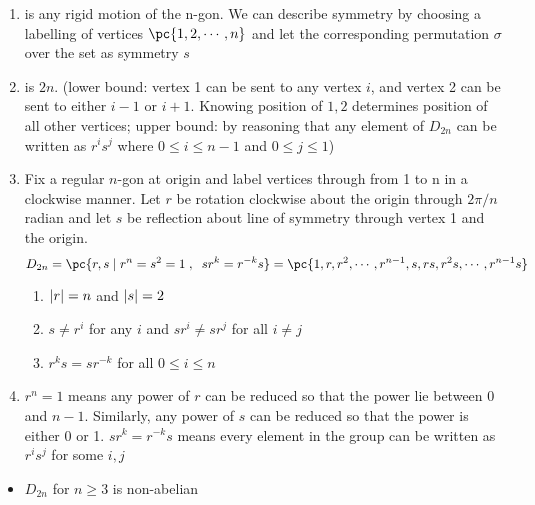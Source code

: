 \documentclass[11pt]{article}
\begin{document}
\begin{definition*}
    \begin{enumerate}
        \item {} is any rigid motion of the n-gon. We can describe symmetry by choosing a labelling of vertices $\pc{1,2,\cdots,n}$ and let the corresponding permutation $\sigma$ over the set as symmetry $s$
        \item {} is $2n$. (lower bound: vertex 1 can be sent to any vertex $i$, and vertex 2 can be sent to either $i-1$ or $i+1$. Knowing position of $1,2$ determines position of all other vertices; upper bound: by reasoning that any element of $D_{2n}$ can be written as $r^is^j$ where $0\leq i \leq n-1$ and $0\leq j \leq 1$)
        \item {} Fix a regular $n$-gon at origin and label vertices through from 1 to n in a clockwise manner. Let $r$ be rotation clockwise about the origin through $2\pi/n$ radian and let $s$ be reflection about line of symmetry through vertex 1 and the origin.
        \[
            D_{2n} = \pc{
                r,s \mid r^n = s^2 = 1 \;, \;\; sr^k = r^{-k}s
            } = 
            \pc{
                1,r,r^2,\cdots,r^{n-1}, s,rs,r^2s,\cdots, r^{n-1}s
            }
        \]
        \begin{enumerate}
            \item $\left|r\right| = n$ and $\left|s\right| = 2$
            \item $s \neq r^i$ for any $i$ and $sr^i \neq sr^j$ for all $i\neq j$
            \item $r^ks = sr^{-k}$ for all $0\leq i \leq n$
        \end{enumerate}
        \item {} $r^n = 1$ means any power of $r$ can be reduced so that the power lie between 0 and $n-1$. Similarly, any power of $s$ can be reduced so that the power is either 0 or 1. $sr^k = r^{-k}s$ means every element in the group can be written as $r^i s^j$ for some $i,j$
    \end{enumerate}
    \begin{itemize}
        \item {} $D_{2n}$ for $n\geq 3$ is non-abelian
    \end{itemize}
\end{definition*}
\end{document}
